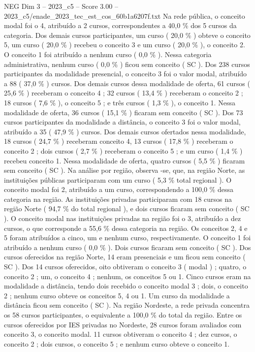 \begin{textsample}{NEG Dim 3 – 2023\_c5 – Score 3.00 – 2023\_c5/enade\_2023\_tec\_est\_cos\_60b1a6207f.txt}
Na rede pública, o conceito modal foi o 4, atribuído a 2 cursos, correspondentes a 40,0 \% dos 5 cursos da categoria.
Dos demais cursos participantes, um curso ( 20,0 \% ) obteve o conceito 5, um curso ( 20,0 \% ) recebeu o conceito 3 e um curso ( 20,0 \% ), o conceito 2.
O conceito 1 foi atribuído a nenhum curso ( 0,0 \% ).
Nessa categoria administrativa, nenhum curso ( 0,0 \% ) ficou sem conceito ( SC ).
Dos 238 cursos participantes da modalidade presencial, o conceito 3 foi o valor modal, atribuído a 88 ( 37,0 \% ) cursos.
Dos demais cursos dessa modalidade de oferta, 61 cursos ( 25,6 \% ) receberam o conceito 4 ; 32 cursos ( 13,4 \% ) receberam o conceito 2 ; 18 cursos ( 7,6 \% ), o conceito 5 ; e três cursos ( 1,3 \% ), o conceito 1.
Nessa modalidade de oferta, 36 cursos ( 15,1 \% ) ficaram sem conceito ( SC ).
Dos 73 cursos participantes da modalidade a distância, o conceito 3 foi o valor modal, atribuído a 35 ( 47,9 \% ) cursos.
Dos demais cursos ofertados nessa modalidade, 18 cursos ( 24,7 \% ) receberam conceito 4, 13 cursos ( 17,8 \% ) receberam o conceito 2 ; dois cursos ( 2,7 \% ) receberam o conceito 5 ; e um curso ( 1,4 \% ) recebeu conceito 1.
Nessa modalidade de oferta, quatro cursos ( 5,5 \% ) ficaram sem conceito ( SC ).
Na análise por região, observa -se, que, na região Norte, as instituições públicas participaram com um curso ( 5,3 \% total regional ).
O conceito modal foi 2, atribuído a um curso, correspondendo a 100,0 \% dessa categoria na região.
As instituições privadas participaram com 18 cursos na região Norte ( 94,7 \% do total regional ), e dois cursos ficaram sem conceito ( SC ).
O conceito modal nas instituições privadas na região foi o 3, atribuído a dez cursos, o que corresponde a 55,6 \% dessa categoria na região.
Os conceitos 2, 4 e 5 foram atribuídos a cinco, um e nenhum curso, respectivamente.
O conceito 1 foi atribuído a nenhum curso ( 0,0 \% ).
Dois cursos ficaram sem conceito ( SC ).
Dos cursos oferecidos na região Norte, 14 eram presenciais e um ficou sem conceito ( SC ).
Dos 14 cursos oferecidos, oito obtiveram o conceito 3 ( modal ) ; quatro, o conceito 2 ; um, o conceito 4 ; nenhum, os conceitos 5 ou 1.
Cinco cursos eram na modalidade a distância, tendo dois recebido o conceito modal 3 ; dois, o conceito 2 ; nenhum curso obteve os conceitos 5, 4 ou 1.
Um curso da modalidade a distância ficou sem conceito ( SC ).
Na região Nordeste, a rede privada concentra os 58 cursos participantes, o equivalente a 100,0 \% do total da região.
Entre os cursos oferecidos por IES privadas no Nordeste, 28 cursos foram avaliados com conceito 3, o conceito modal. 11 cursos obtiveram o conceito 4 ; dez cursos, o conceito 2 ; dois cursos, o conceito 5 ; e nenhum curso obteve o conceito 1.

\end{textsample}
